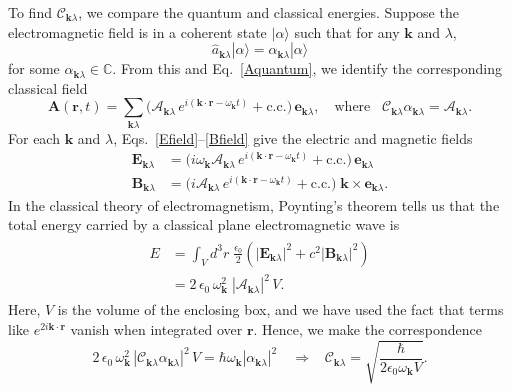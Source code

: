 \documentclass[pra,12pt]{revtex4}
\begin{document}
To find $\mathcal{C}_{\mathbf{k}\lambda}$, we compare the quantum and
classical energies.  Suppose the electromagnetic field is in a
coherent state $|\alpha\rangle$ such that for any $\mathbf{k}$ and
$\lambda$,
\begin{equation}
  \hat{a}_{\mathbf{k}\lambda}|\alpha\rangle
  = \alpha_{\mathbf{k}\lambda}|\alpha\rangle
  \label{coherent}
\end{equation}
for some $\alpha_{\mathbf{k}\lambda} \in \mathbb{C}$.  From this and
Eq.~\eqref{Aquantum}, we identify the corresponding classical field
\begin{equation}
  \mathbf{A}(\mathbf{r},t) = \sum_{\mathbf{k}\lambda} 
    \Big(\mathcal{A}_{\mathbf{k}\lambda}\,
    e^{i(\mathbf{k}\cdot\mathbf{r} - \omega_{\mathbf{k}} t)}
    + \mathrm{c.c.}\Big)\, \mathbf{e}_{\mathbf{k}\lambda},
    \quad \mathrm{where}\;\;\;
    \mathcal{C}_{\mathbf{k}\lambda} \alpha_{\mathbf{k}\lambda}
    = \mathcal{A}_{\mathbf{k}\lambda}.
\end{equation}
For each $\mathbf{k}$ and $\lambda$,
Eqs.~\eqref{Efield}--\eqref{Bfield} give the electric and magnetic
fields
\begin{align}
  \mathbf{E}_{\mathbf{k}\lambda}  &=
  \Big(i\omega_{\mathbf{k}} \mathcal{A}_{\mathbf{k}\lambda}\,
    e^{i(\mathbf{k}\cdot\mathbf{r} - \omega_{\mathbf{k}} t)}
    + \mathrm{c.c.}\Big)\, \mathbf{e}_{\mathbf{k}\lambda} \\
    \mathbf{B}_{\mathbf{k}\lambda} &=
    \Big(i \mathcal{A}_{\mathbf{k}\lambda}\,
    e^{i(\mathbf{k}\cdot\mathbf{r} - \omega_{\mathbf{k}} t)}
    + \mathrm{c.c.}\Big) \; \mathbf{k} \times \mathbf{e}_{\mathbf{k}\lambda}.
\end{align}
In the classical theory of electromagnetism, Poynting's theorem tells
us that the total energy carried by a classical plane electromagnetic
wave is
\begin{align}
  \begin{aligned}
  E &= \int_V d^3\!r\; \frac{\epsilon_0}{2} \left(
  \big|\mathbf{E}_{\mathbf{k}\lambda}\big|^2
  + c^2 \big|\mathbf{B}_{\mathbf{k}\lambda}\big|^2 \right) \\
  &= 2 \, \epsilon_0\, \omega_{\mathbf{k}}^2 \;
  |\mathcal{A}_{\mathbf{k}\lambda}|^2 \,V.
  \end{aligned}
\end{align}
Here, $V$ is the volume of the enclosing box, and we have used the
fact that terms like $e^{2i\mathbf{k}\cdot\mathbf{r}}$ vanish when
integrated over $\mathbf{r}$.  Hence, we make the correspondence
\begin{equation}
  2\,\epsilon_0\, \omega_{\mathbf{k}}^2 \,
  |\mathcal{C}_{\mathbf{k}\lambda}\alpha_{\mathbf{k}\lambda}|^2 \, V
  = \hbar \omega_{\mathbf{k}} |\alpha_{\mathbf{k}\lambda}|^2 \quad
  \Rightarrow\;\;\; \mathcal{C}_{\mathbf{k}\lambda} =
  \sqrt{\frac{\hbar}{2\epsilon_0\omega_{\mathbf{k}}V}}.
\end{equation}
\end{document}
